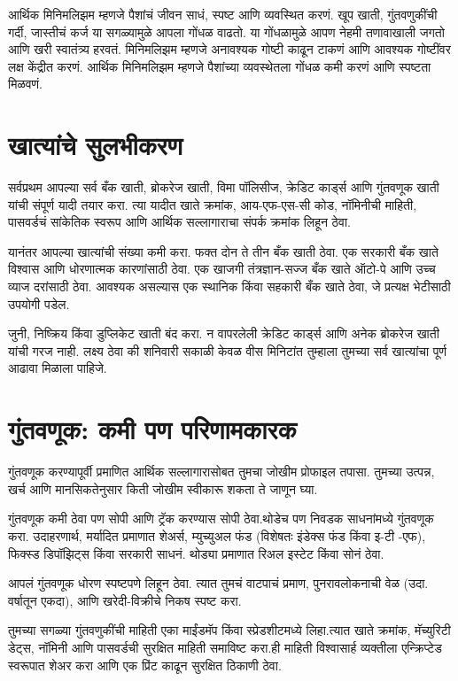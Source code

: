 आर्थिक मिनिमलिझम म्हणजे पैशांचं जीवन साधं, स्पष्ट आणि व्यवस्थित करणं. खूप खाती, गुंतवणुकींची गर्दी, जास्तीचं कर्ज या सगळ्यामुळे आपला गोंधळ वाढतो. या गोंधळामुळे आपण नेहमी तणावाखाली जगतो आणि खरी स्वातंत्र्य हरवतं. मिनिमलिझम म्हणजे अनावश्यक गोष्टी काढून टाकणं आणि आवश्यक गोष्टींवर लक्ष केंद्रीत करणं. आर्थिक मिनिमलिझम म्हणजे पैशांच्या व्यवस्थेतला गोंधळ कमी करणं आणि स्पष्टता मिळवणं.



\section*{खात्यांचे सुलभीकरण}

सर्वप्रथम आपल्या सर्व बँक खाती, ब्रोकरेज खाती, विमा पॉलिसीज, क्रेडिट कार्ड्स आणि गुंतवणूक खाती यांची संपूर्ण यादी तयार करा. त्या यादीत खाते क्रमांक, आय-एफ-एस-सी कोड, नॉमिनीची माहिती, पासवर्डचं सांकेतिक स्वरूप आणि आर्थिक सल्लागाराचा संपर्क क्रमांक लिहून ठेवा.

यानंतर आपल्या खात्यांची संख्या कमी करा. फक्त दोन ते तीन बँक खाती ठेवा. एक सरकारी बँक खाते विश्वास आणि धोरणात्मक कारणांसाठी ठेवा. एक खाजगी तंत्रज्ञान-सज्ज बँक खाते ऑटो-पे आणि उच्च व्याज दरांसाठी ठेवा.
आवश्यक असल्यास एक स्थानिक किंवा सहकारी बँक खाते ठेवा, जे प्रत्यक्ष भेटीसाठी उपयोगी पडेल.

जुनी, निष्क्रिय किंवा डुप्लिकेट खाती बंद करा. न वापरलेली क्रेडिट कार्ड्स आणि अनेक ब्रोकरेज खाती यांची गरज नाही. लक्ष्य ठेवा की शनिवारी सकाळी केवळ वीस मिनिटांत तुम्हाला तुमच्या सर्व खात्यांचा पूर्ण आढावा मिळाला पाहिजे.



\section*{गुंतवणूक: कमी पण परिणामकारक}

गुंतवणूक करण्यापूर्वी प्रमाणित आर्थिक सल्लागारासोबत तुमचा जोखीम प्रोफाइल तपासा. तुमच्या उत्पन्न, खर्च आणि मानसिकतेनुसार किती जोखीम स्वीकारू शकता ते जाणून घ्या.

गुंतवणूक कमी ठेवा पण सोपी आणि ट्रॅक करण्यास सोपी ठेवा.थोडेच पण निवडक साधनांमध्ये गुंतवणूक करा.
उदाहरणार्थ, मर्यादित प्रमाणात शेअर्स, म्युच्युअल फंड (विशेषतः इंडेक्स फंड किंवा इ-टी -एफ), फिक्स्ड डिपॉझिट्स किंवा सरकारी साधनं. थोड्या प्रमाणात रिअल इस्टेट किंवा सोनं ठेवा.

आपलं गुंतवणूक धोरण स्पष्टपणे लिहून ठेवा. त्यात तुमचं वाटपाचं प्रमाण, पुनरावलोकनाची वेळ (उदा. वर्षातून एकदा), आणि खरेदी-विक्रीचे निकष स्पष्ट करा.

तुमच्या सगळ्या गुंतवणुकींची माहिती एका माईंडमॅप किंवा स्प्रेडशीटमध्ये लिहा.त्यात खाते क्रमांक, मॅच्युरिटी डेट्स, नॉमिनी आणि पासवर्डची सुरक्षित माहिती समाविष्ट करा.ही माहिती विश्वासार्ह व्यक्तीला एन्क्रिप्टेड स्वरूपात शेअर करा आणि एक प्रिंट काढून सुरक्षित ठिकाणी ठेवा.

